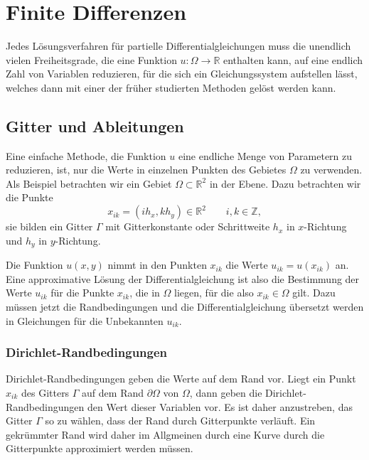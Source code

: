 %
%
%
\section{Finite Differenzen
\label{section:finite-differenzen}}
Jedes Lösungsverfahren für partielle Differentialgleichungen muss die
unendlich vielen Freiheitsgrade, die eine Funktion
$u\colon\Omega\to\mathbb R$ enthalten kann, auf eine endlich Zahl von
Variablen reduzieren, für die sich ein Gleichungssystem aufstellen 
lässt, welches dann mit einer der früher studierten Methoden
gelöst werden kann.

%
%
\subsection{Gitter und Ableitungen
\label{pde:subsection:gitter}}
Eine einfache Methode, die Funktion $u$ eine endliche Menge von Parametern
zu reduzieren, ist, nur die Werte in einzelnen Punkten des Gebietes 
$\Omega$ zu verwenden.
Als Beispiel betrachten wir ein Gebiet $\Omega\subset\mathbb R^2$
in der Ebene.
Dazu betrachten wir die Punkte
\[
x_{ik} = (ih_x, kh_y) \in \mathbb R^2
\qquad
i,k\in\mathbb Z,
\]
sie bilden ein Gitter $\Gamma$ mit Gitterkonstante oder Schrittweite
$h_x$ in $x$-Richtung und $h_y$ in $y$-Richtung.

Die Funktion $u(x,y)$ nimmt in den Punkten $x_{ik}$ die Werte
$u_{ik} = u(x_{ik})$ an.
Eine approximative Lösung der Differentialgleichung ist also
die Bestimmung der Werte $u_{ik}$ für die Punkte $x_{ik}$, die in
$\Omega$ liegen, für die also $x_{ik}\in\Omega$ gilt.
Dazu müssen jetzt die Randbedingungen und die Differentialgleichung
übersetzt werden in Gleichungen für die Unbekannten $u_{ik}$.

\subsubsection{Dirichlet-Randbedingungen}
Dirichlet-Randbedingungen geben die Werte auf dem Rand vor.
Liegt ein Punkt $x_{ik}$ des Gitters $\Gamma$ auf dem Rand $\partial\Omega$
von $\Omega$, dann geben die Dirichlet-Randbedingungen den Wert
dieser Variablen vor.
Es ist daher anzustreben, das Gitter $\Gamma$ so zu wählen, dass 
der Rand durch Gitterpunkte verläuft.
Ein gekrümmter Rand wird daher im Allgmeinen durch eine Kurve durch
die Gitterpunkte approximiert werden müssen.

